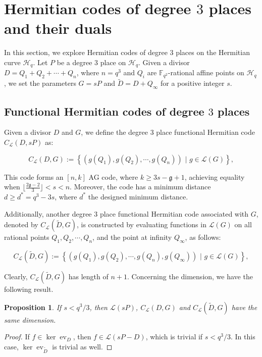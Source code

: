 \documentclass[11pt]{amsart}
\theoremstyle{plain}
\newtheorem{proposition}[theorem]{Proposition}
\theoremstyle{definition}
\theoremstyle{remark}
\newcommand{\g}{\mathfrak{g}}
\DeclareMathOperator{\ev}{ev}
\begin{document}
\section{Hermitian codes of degree $3$ places and their duals \label{sec:Herm}}

In this section, we explore Hermitian codes of degree $3$ places on the Hermitian curve $\mathscr{H}_q$. Let $P$ be a degree $3$ place on $\mathscr{H}_q$. Given a divisor $D=Q_1+Q_2+\cdots+Q_n$, where $n=q^3$ and $Q_i$ are $\mathbb{F}_{q^2}$-rational affine points on $\mathscr{H}_q$, we set the parameters $G=sP$ and $\widetilde{D}=D+Q_{\infty}$ for a positive integer $s$.


\subsection{Functional Hermitian codes of degree $3$ places}
Given a divisor $D$ and $G$, we define the degree $3$ place functional Hermitian code $C_{\mathcal{L}}(D,sP)$ as:

\[C_{\mathcal{L}}(D,G):= \left\lbrace \left(g(Q_1),g(Q_2),\cdots,g(Q_n) \right)\,\, |\,\, g \in  \mathscr{L}(G) \right\rbrace, \]

This code forms an $[n,k]$ AG code, where $k\geq 3s-\g+1$, achieving equality when $\lfloor\frac{ 2 \g-2}{3}\rfloor <s<n$. Moreover, the code has a minimum distance $d\geq d^*=q^3-3s$, where $d^*$ the designed minimum distance.

Additionally, another degree $3$ place functional Hermitian code associated with $G$, denoted by $C_{\mathcal{L}}(\widetilde{D},G)$, is constructed by evaluating functions in $\mathscr{L}(G)$ on all rational points $Q_1,Q_2,\cdots,Q_n$, and the point at infinity $Q_{\infty}$, as follows:

\[C_{\mathcal{L}}(\widetilde{D},G):= \left\lbrace \left(g(Q_1),g(Q_2),\cdots,g(Q_n),g(Q_{\infty}) \right)\,\, |\,\, g \in  \mathscr{L}(G)\right\rbrace ,\]

Clearly, $C_{\mathcal{L}}(\widetilde{D},G)$ has length of $n+1$. Concerning the dimension, we have the following result.
\begin{proposition}
If $s< q^3/3$, then $\mathscr{L}(sP)$, $C_{\mathcal{L}}(D,G)$ and $C_{\mathcal{L}}(\widetilde{D},G)$ have the same dimension. 
\end{proposition}
\begin{proof}
If $f\in \ker \ev_D$, then $f\in \mathscr{L}(sP-D)$, which is trivial if $s<q^3/3$. In this case, $\ker \ev_{\widetilde{D}}$ is trivial as well. 
\end{proof}
\end{document}
